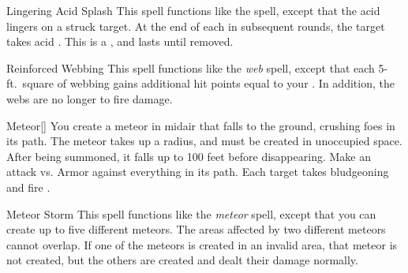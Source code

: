 \lowercase{\hypertarget{spell:Lingering Acid Splash}{}}\label{spell:Lingering Acid Splash}
\begin{ability}[\nth{3}]{\hypertarget{spell:Lingering Acid Splash}{Lingering Acid Splash}}
This spell functions like the  spell, except that the acid lingers on a struck target.
At the end of each  in subsequent rounds, the target takes acid .
This is a , and lasts until removed.
\end{ability}
\vspace{0.25em}



\lowercase{\hypertarget{spell:Reinforced Webbing}{}}\label{spell:Reinforced Webbing}
\begin{ability}[\nth{3}]{\hypertarget{spell:Reinforced Webbing}{Reinforced Webbing}}
This spell functions like the \textit{web} spell, except that each 5-ft.\ square of webbing gains additional hit points equal to your .
In addition, the webs are no longer  to fire damage.
\end{ability}
\vspace{0.25em}



\lowercase{\hypertarget{spell:Meteor}{}}\label{spell:Meteor}
\begin{ability}[\nth{4}]{\hypertarget{spell:Meteor}{Meteor}}[]
You create a meteor in midair that falls to the ground, crushing foes in its path.
The meteor takes up a \areamed radius, and must be created in unoccupied space.
After being summoned, it falls up to 100 feet before disappearing.
Make an attack vs. Armor against everything in its path.
\hit Each target takes bludgeoning and fire .
\end{ability}
\vspace{0.25em}



\lowercase{\hypertarget{spell:Meteor Storm}{}}\label{spell:Meteor Storm}
\begin{ability}[\nth{6}]{\hypertarget{spell:Meteor Storm}{Meteor Storm}}
This spell functions like the \textit{meteor} spell, except that you can create up to five different meteors.
The areas affected by two different meteors cannot overlap.
If one of the meteors is created in an invalid area, that meteor is not created, but the others are created and dealt their damage normally.
\end{ability}
\vspace{0.25em}



